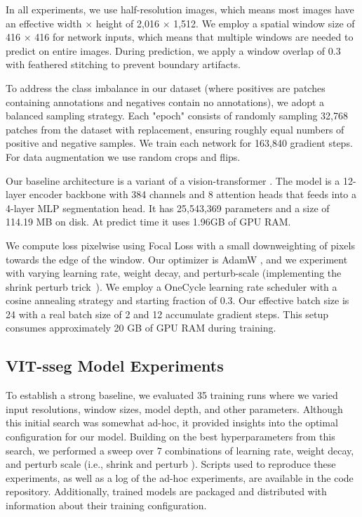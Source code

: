 In all experiments, we use half-resolution images, which means most images have an effective width $\times$
  height of 2,016 $\times$ 1,512.
We employ a spatial window size of 416 $\times$ 416 for network inputs, which means that multiple windows
  are needed to predict on entire images.
During prediction, we apply a window overlap of 0.3 with feathered stitching to prevent boundary artifacts.

To address the class imbalance in our dataset (where positives are patches containing annotations and
  negatives contain no annotations), we adopt a balanced sampling strategy.
Each "epoch" consists of randomly sampling 32,768 patches from the dataset with replacement, ensuring
  roughly equal numbers of positive and negative samples.
We train each network for 163,840 gradient steps.
For data augmentation we use random crops and flips.

Our baseline architecture is a variant \cite{bertasius2021space,Greenwell_2024_WACV} of a vision-transformer
  \cite{dosovitskiy_image_2021}.
The model is a 12-layer encoder backbone with 384 channels and 8 attention heads that feeds into a 4-layer
  MLP segmentation head.
It has 25,543,369 parameters and a size of 114.19 MB on disk.
At predict time it uses 1.96GB of GPU RAM.

We compute loss pixelwise using Focal Loss \cite{ross2017focal} with a small downweighting of pixels towards
  the edge of the window.
Our optimizer is AdamW \cite{loshchilov_decoupled_2018}, and we experiment with varying learning rate,
  weight decay, and perturb-scale (implementing the shrink perturb trick~\cite{ash_warm_starting_2020,dohare_loss_2023}).
We employ a OneCycle learning rate scheduler \cite{smith2019super} with a cosine annealing strategy and
  starting fraction of 0.3.
Our effective batch size is 24 with a real batch size of 2 and 12 accumulate gradient steps.
This setup consumes approximately 20 GB of GPU RAM during training.

\subsection{VIT-sseg Model Experiments}

To establish a strong baseline, we evaluated 35 training runs where we varied input resolutions, window
  sizes, model depth, and other parameters.
Although this initial search was somewhat ad-hoc, it provided insights into the optimal configuration for
  our model.
Building on the best hyperparameters from this search, we performed a sweep over 7 combinations of learning
  rate, weight decay, and perturb scale (i.e., shrink and perturb \cite{ash_warm_starting_2020,dohare_loss_2023}).
Scripts used to reproduce these experiments, as well as a log of the ad-hoc experiments, are available in
  the code repository.
Additionally, trained models are packaged and distributed with information about their training
  configuration.

